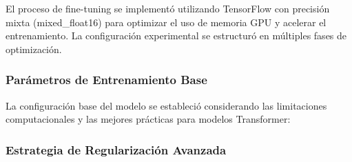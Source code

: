 El proceso de fine-tuning se implementó utilizando TensorFlow con precisión mixta (mixed\_float16) para optimizar el uso de memoria GPU y acelerar el entrenamiento. La configuración experimental se estructuró en múltiples fases de optimización.

\subsubsection{Parámetros de Entrenamiento Base}

La configuración base del modelo se estableció considerando las limitaciones computacionales y las mejores prácticas para modelos Transformer:

\begin{table}[htbp]
\centering
{}
\caption{Configuración de parámetros base para el entrenamiento de DistilBERT.}
\label{tab:parametros_base_distilbert}
\end{table}

\subsubsection{Estrategia de Regularización Avanzada}

